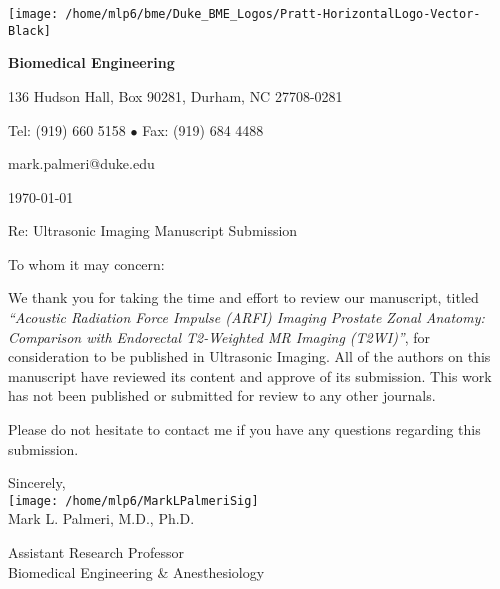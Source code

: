 \documentclass[10pt]{article}
\begin{document}
\begin{minipage}[t]{0.5\linewidth}
\vspace{0pt}
\texttt{[image: /home/mlp6/bme/Duke\_BME\_Logos/Pratt-HorizontalLogo-Vector-Black]}
\end{minipage}\hfill
\begin{minipage}[t]{0.5\linewidth}
\vspace{0pt}
\hfill{\bf Biomedical Engineering}\\

\begin{small}
\hfill 136 Hudson Hall, Box 90281, Durham, NC 27708-0281

\hfill Tel: (919) 660 5158 $\bullet$ Fax: (919) 684 4488

\hfill mark.palmeri@duke.edu\\
\end{small}
\end{minipage}
\begin{Large}

\vspace{0.25in}
\today
\vspace{0.25in}

Re: Ultrasonic Imaging Manuscript Submission
\vspace{0.25in}

To whom it may concern:
\vspace{0.1in}

We thank you for taking the time and effort to review our manuscript, titled
{\it ``Acoustic Radiation Force Impulse (ARFI) Imaging Prostate Zonal Anatomy:
    Comparison with Endorectal T2-Weighted MR Imaging (T2WI)''}, for
consideration to be published in Ultrasonic Imaging.  All of the authors on
this manuscript have reviewed its content and approve of its submission.  This
work has not been published or submitted for review to any other journals.

Please do not hesitate to contact me if you have any questions regarding this
submission.

\vspace{0.25in}

Sincerely,\\
\texttt{[image: /home/mlp6/MarkLPalmeriSig]}\\
Mark L. Palmeri, M.D., Ph.D.\\
\end{Large}
Assistant Research Professor\\
Biomedical Engineering \& Anesthesiology
\end{document}
